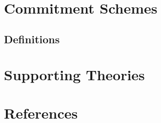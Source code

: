 \chapter{Commitment Schemes}\label{chap:commitment_schemes}

\section{Definitions}





\chapter{Supporting Theories}\label{chap:supporting_theories}







\chapter{References}\label{chap:references}
